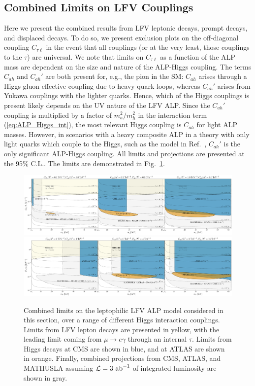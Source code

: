 \subsection{Combined Limits on LFV Couplings}\label{sec:higgs_combined}
Here we present the combined results from LFV leptonic decays, prompt decays, and displaced decays. To do so, we present exclusion plots on the off-diagonal coupling $C_{\tau \ell}$ in the event that all couplings (or at the very least, those couplings to the $\tau$) are universal. We note that limits on $C_{\tau \ell}$ as a function of the ALP mass are dependent on the size and nature of the ALP-Higgs coupling. The terms $C_{ah}$ and $C_{ah}'$ are both present for, e.g., the pion in the SM: $C_{ah}$ arises through a Higgs-gluon effective coupling due to heavy quark loops, whereas $C_{ah}'$ arises from Yukawa couplings with the lighter quarks. Hence, which of the Higgs couplings is present likely depends on the UV nature of the LFV ALP. Since the $C_{ah}'$ coupling is multiplied by a factor of $m_a^2/m_h^2$ in the interaction term (\ref{eq:ALP_Higgs_int}), the most relevant Higgs coupling is $C_{ah}$ for light ALP masses. However, in scenarios with a heavy composite ALP in a theory with only light quarks which couple to the Higgs, such as the model in Ref.~\cite{Davoudiasl:2017zws}, $C_{ah}'$ is the only significant ALP-Higgs coupling. All limits and projections are presented at the 95\% C.L.. The limits are demonstrated in Fig.~\ref{fig:LFV_ALP_limits}.

\begin{figure}[t!]
    \centering
    \includegraphics[trim={8cm 0 8cm 0}, width=\linewidth]{figures/chapter5/Ctl_vs_ma_limits_Cahp=0.pdf}
    \includegraphics[trim={8cm 0 8cm 0}, width=\linewidth]{figures/chapter5/Ctl_vs_ma_limits_Cah=0.pdf}
    \caption[Constraints on LFV ALP models at CMS, ATLAS, and MATHUSLA in the ALP mass and lepton-ALP coupling plane.]{Combined limits on the leptophilic LFV ALP model considered in this section, over a range of different Higgs interaction couplings. Limits from LFV lepton decays are presented in yellow, with the leading limit coming from $\mu \rightarrow e\gamma$ through an internal $\tau$. Limits from Higgs decays at CMS are shown in blue, and at ATLAS are shown in orange. Finally, combined projections from CMS, ATLAS, and MATHUSLA assuming ${\cal L} = 3~{\rm ab}^{-1}$ of integrated luminosity are shown in gray.}
    \label{fig:LFV_ALP_limits}
\end{figure}


